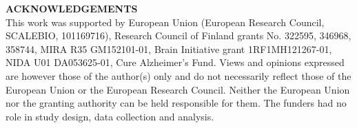 \documentclass[final]{beamer}
\begin{document}
\begin{poster}
\vspace{1.5cm}
\textcolor{COM}{\Large \bf ACKNOWLEDGEMENTS} \\
\vspace{0.5cm}
\scriptsize 
\textcolor{grey55}{This work was supported by European Union (European Research Council, SCALEBIO, 101169716), Research Council of Finland grants No. 322595, 346968, 358744, MIRA R35 GM152101-01, Brain Initiative grant 1RF1MH121267-01, NIDA U01 DA053625-01, Cure Alzheimer’s Fund. Views and opinions expressed are however those of the author(s) only and do not necessarily reflect those of the European Union or the European Research Council. Neither the European Union nor the granting authority can be held responsible for them. The funders had no role in study design, data collection and analysis.}

\vspace{0.5em}
\printbibliography[heading=none]

\end{poster}
\end{document}
